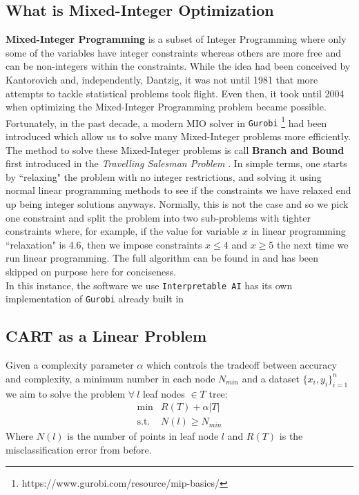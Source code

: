 \documentclass[11pt,a4paper]{report}
\begin{document}
\subsection{What is Mixed-Integer Optimization}
\textbf{Mixed-Integer Programming} is a subset of Integer Programming where only some of the variables have integer constraints whereas others are more free and can be non-integers within the constraints.
While the idea had been conceived by Kantorovich and, independently, Dantzig, it was not until 1981 \cite{arthanaridodge} that more attempts to tackle statistical problems took flight.
Even then, it took until 2004 \cite{bixby} when optimizing the Mixed-Integer Programming problem became possible. 
Fortunately, in the past decade, a modern MIO solver in  {\color{blue} \texttt{Gurobi}} \footnote{https://www.gurobi.com/resource/mip-basics/} had been introduced which allow us to solve many Mixed-Integer problems more efficiently.
\medskip\\
The method to solve these Mixed-Integer problems is call \textbf{Branch and Bound} first introduced in the \textit{Travelling Salesman Problem} \cite{travellingsalesman}. 
In simple terms, one starts by ``relaxing" the problem with no integer restrictions, and solving it using normal linear programming methods to see if the constraints we have relaxed end up being integer solutions anyways.
Normally, this is not the case and so we pick one constraint and split the problem into two sub-problems with tighter constraints where, for example, if the value for variable $x$ in linear programming ``relaxation" is 4.6, then we impose constraints $x \leq 4$ and $x \geq 5$ the next time we run linear programming.
The full algorithm can be found in \cite{travellingsalesman} and has been skipped on purpose here for conciseness.
\medskip\\
{\color{brown} In this instance, the software we use {\color{blue} \texttt{Interpretable AI}} has its own implementation of {\color{blue} \texttt{Gurobi}} already built in}

\subsection{CART as a Linear Problem}
Given a complexity parameter $\alpha$ which controls the tradeoff between accuracy and complexity, a minimum number in each node $N_{min}$ and a dataset $\{x_i, y_i\}_{i=1}^{n}$ we aim to solve the problem $\forall \ l$ leaf nodes $ \in T$ tree:
\[ \begin{array}{cc}
        \min  & R(T) + \alpha \left|T\right|\\
        \text{s.t.}  & N(l) \geq N_{min}
    \end{array} \]
Where $N(l)$ is the number of points in leaf node $l$ and $R(T)$ is the misclassification error from before.
\end{document}
